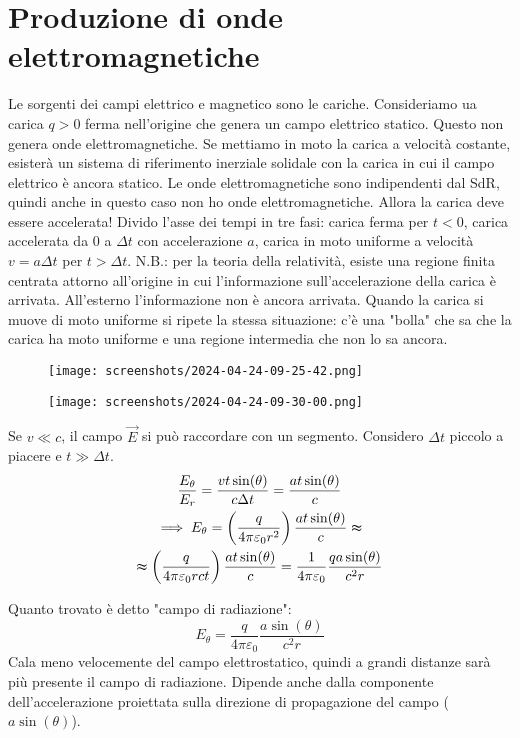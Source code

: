 
\section{Produzione di onde elettromagnetiche}
Le sorgenti dei campi elettrico e magnetico sono le cariche. Consideriamo ua carica \(q>0\) ferma nell'origine che genera un campo elettrico statico. Questo non genera onde elettromagnetiche. Se mettiamo in moto la carica a velocità costante, esisterà un sistema di riferimento inerziale solidale con la carica in cui il campo elettrico è ancora statico. Le onde elettromagnetiche sono indipendenti dal SdR, quindi anche in questo caso non ho onde elettromagnetiche. Allora la carica deve essere accelerata! Divido l'asse dei tempi in tre fasi: carica ferma per \(t<0\), carica accelerata da \(0\) a \(\Delta t\) con accelerazione \(a\), carica in moto uniforme a velocità \(v=a \Delta t\) per \(t> \Delta t\). N.B.: per la teoria della relatività, esiste una regione finita centrata attorno all'origine in cui l'informazione sull'accelerazione della carica è arrivata. All'esterno l'informazione non è ancora arrivata. Quando la carica si muove di moto uniforme si ripete la stessa situazione: c'è una "bolla" che sa che la carica ha moto uniforme e una regione intermedia che non lo sa ancora.
\begin{figure}[H]
	\centering
	\texttt{[image: screenshots/2024-04-24-09-25-42.png]}
\end{figure}
\begin{figure}[H]
	\centering
	\texttt{[image: screenshots/2024-04-24-09-30-00.png]}
\end{figure}
Se \(v \ll c\), il campo \(\vec{E}\) si può raccordare con un segmento. Considero \(\Delta t\) piccolo a piacere e \(t \gg \Delta t\).
\begin{gather}
	\frac{E_{\theta } }{E_r} = \frac{vt \sin (\theta )}{c \Delta t} = \frac{a t \sin (\theta )}{c}\\
	\implies E_{\theta } = \left( \frac{q}{4 \pi \varepsilon _0 r^{2} } \right) \frac{a t \sin (\theta )}{c} \thickapprox \\
	\thickapprox \left( \frac{q}{4 \pi \varepsilon _0 r c t} \right) \frac{a t \sin (\theta )}{c} = \frac{1}{4\pi \varepsilon _0}\frac{qa \sin (\theta )}{c^{2} r}
\end{gather}
\begin{definition}
	Quanto trovato è detto "campo di radiazione":
	\begin{equation}
		E_{\theta } = \frac{q}{4 \pi \varepsilon _0}\frac{a \sin (\theta )}{c^{2} r} 
	\end{equation}
	Cala meno velocemente del campo elettrostatico, quindi a grandi distanze sarà più presente il campo di radiazione. Dipende anche dalla componente dell'accelerazione proiettata sulla direzione di propagazione del campo (\(a \sin (\theta )\)).
\end{definition}
